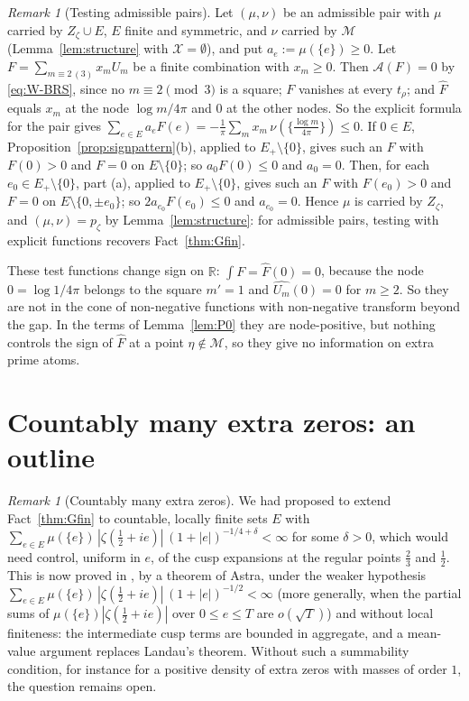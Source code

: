 \documentclass[11pt]{amsart}
\newcommand{\RR}{\mathbb R}
\newcommand{\hF}{\widehat F}
\newcommand{\BRS}{\mathcal M}
\newcommand{\Zz}{Z_\zeta}
\newcommand{\pz}{p_\zeta}
\newcommand{\Arch}{\mathcal A}
\theoremstyle{definition}
\theoremstyle{remark}
\newtheorem{remark}[theorem]{Remark}
\numberwithin{equation}{section}
\begin{document}
\begin{remark}[Testing admissible pairs]\label{rem:signpattern-test}
Let $(\mu,\nu)$ be an admissible pair with $\mu$ carried by $\Zz\cup E$, $E$ finite and symmetric, and $\nu$ carried by $\BRS$
(Lemma~\ref{lem:structure} with $\mathcal X=\emptyset$), and put $a_e:=\mu(\{e\})\ge0$. Let $F=\sum_{m\equiv2\,(3)}x_mU_m$ be a finite
combination with $x_m\ge0$. Then $\Arch(F)=0$ by \eqref{eq:W-BRS}, since no $m\equiv2\pmod3$ is a square; $F$ vanishes at every $t_\rho$;
and $\hF$ equals $x_m$ at the node $\log m/4\pi$ and $0$ at the other nodes. So the explicit formula for the pair gives
$\sum_{e\in E}a_eF(e)=-\frac1\pi\sum_mx_m\,\nu(\{\frac{\log m}{4\pi}\})\le0$. If $0\in E$, Proposition~\ref{prop:signpattern}(b), applied to
$E_+\setminus\{0\}$, gives such an $F$ with $F(0)>0$ and $F=0$ on $E\setminus\{0\}$; so $a_0F(0)\le0$ and $a_0=0$. Then, for each
$e_0\in E_+\setminus\{0\}$, part (a), applied to $E_+\setminus\{0\}$, gives such an $F$ with $F(e_0)>0$ and $F=0$ on $E\setminus\{0,\pm e_0\}$;
so $2a_{e_0}F(e_0)\le0$ and $a_{e_0}=0$. Hence $\mu$ is carried by $\Zz$, and $(\mu,\nu)=\pz$ by Lemma~\ref{lem:structure}: for admissible
pairs, testing with explicit functions recovers Fact~\ref{thm:Gfin}.

These test functions change sign on $\RR$: $\int F=\hF(0)=0$, because the node $0=\log1/4\pi$ belongs to the square $m'=1$ and
$\widehat{U_m}(0)=0$ for $m\ge2$. So they are not in the cone of non-negative functions with non-negative transform beyond the gap. In the
terms of Lemma~\ref{lem:P0} they are node-positive, but nothing controls the sign of $\hF$ at a point $\eta\notin\BRS$, so they give no
information on extra prime atoms.
\end{remark}

\section{Countably many extra zeros: an outline}\label{sec:countable}

\begin{remark}[Countably many extra zeros]\label{rem:Gsum}
We had proposed to extend Fact~\ref{thm:Gfin} to countable, locally finite sets $E$ with
$\sum_{e\in E}\mu(\{e\})\,|\zeta(\frac12+ie)|\,(1+|e|)^{-1/4+\delta}<\infty$ for some $\delta>0$, which would need control, uniform in $e$,
of the cusp expansions at the regular points $\frac23$ and $\frac12$. This is now proved in \cite[Theorem~3.8]{PaperI}, by a theorem of Astra, under the
weaker hypothesis $\sum_{e\in E}\mu(\{e\})\,|\zeta(\frac12+ie)|\,(1+|e|)^{-1/2}<\infty$ (more generally, when the partial sums of
$\mu(\{e\})|\zeta(\frac12+ie)|$ over $0\le e\le T$ are $o(\sqrt T)$) and without local finiteness: the intermediate cusp terms are bounded
in aggregate, and a mean-value argument replaces Landau's theorem. Without such a summability condition, for instance for a positive
density of extra zeros with masses of order $1$, the question remains open.
\end{remark}
\end{document}
